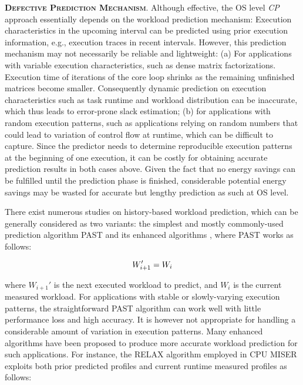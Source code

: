 \documentclass[12pt]{elsarticle}
\begin{document}
\vspace{1mm}
\noindent\textsc{\textbf{Defective Prediction Mechanism}}. Although effective, the OS level \emph{CP} approach essentially depends on the workload prediction mechanism: Execution characteristics in the upcoming interval can be predicted using prior execution information, e.g., execution traces in recent intervals. However, this prediction mechanism may not necessarily be reliable and lightweight: (a) For applications with variable execution characteristics, such as dense matrix factorizations. Execution time of iterations of the core loop shrinks as the remaining unfinished matrices become smaller. Consequently dynamic prediction on execution characteristics such as task runtime and workload distribution can be inaccurate, which thus leads to error-prone slack estimation; (b) for applications with random execution patterns, such as applications relying on random numbers that could lead to variation of control flow at runtime, which can be difficult to capture. Since the predictor needs to determine reproducible execution patterns at the beginning of one execution, it can be costly for obtaining accurate prediction results in both cases above. Given the fact that no energy savings can be fulfilled until the prediction phase is finished, considerable potential energy savings may be wasted for accurate but lengthy prediction as such at OS level.

There exist numerous studies on history-based workload prediction, which can be generally considered as two variants: the simplest and mostly commonly-used prediction algorithm PAST \cite{osdi94} and its enhanced algorithms \cite{cases03} \cite{date04} \cite{sc05c} \cite{icpp07}, where PAST works as follows:

\vspace{-5mm}
\begin{equation}
\label{past_algorithm}
W_{i+1}' = W_i
\vspace{-1mm}
\end{equation}

\noindent where $W_{i+1}'$ is the next executed workload to predict, and $W_i$ is the current measured workload. For applications with stable or slowly-varying execution patterns, the straightforward PAST algorithm can work well with little performance loss and high accuracy. It is however not appropriate for handling a considerable amount of variation in execution patterns. Many enhanced algorithms have been proposed to produce more accurate workload prediction for such applications. For instance, the RELAX algorithm employed in CPU MISER \cite{icpp07} exploits both prior predicted profiles and current runtime measured profiles as follows:
\end{document}
